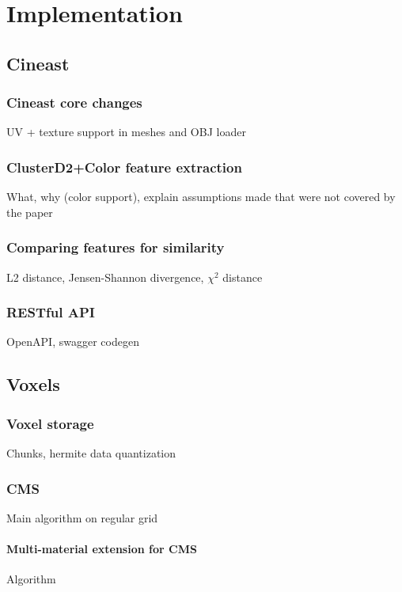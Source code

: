 \chapter{Implementation}

\section{Cineast}

\subsection{Cineast core changes}
UV + texture support in meshes and OBJ loader

\subsection{ClusterD2+Color feature extraction}
What, why (color support), explain assumptions made that were not covered by the paper

\subsection{Comparing features for similarity}
L2 distance, Jensen-Shannon divergence, $\chi^2$ distance

\subsection{RESTful API}
OpenAPI, swagger codegen

\section{Voxels}

\subsection{Voxel storage}
Chunks, hermite data quantization

\subsection{CMS}
Main algorithm on regular grid

\subsubsection{Multi-material extension for CMS}
Algorithm

